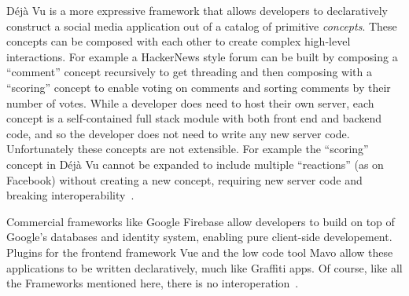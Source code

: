 Déjà Vu is a more expressive framework that allows developers
to declaratively construct a social media application out
of a catalog of primitive \emph{concepts}.
These concepts can be composed with each other to create complex
high-level interactions.
For example a HackerNews style forum can be built by
composing a ``comment'' concept
recursively to get threading and then composing
with a ``scoring'' concept to enable voting on comments and
sorting comments by their number of votes.
While a developer does need to host their own server,
each concept is a self-contained full stack module with both
front end and backend code, and so the developer does not need to write any new server code.
Unfortunately these concepts are not extensible.
For example the ``scoring'' concept in Déjà Vu cannot be expanded
to include multiple ``reactions'' (as on Facebook)
without creating a new concept, requiring new server code
and breaking interoperability~\cite{dejavu}.

Commercial frameworks like Google Firebase allow developers
to build on top of Google's databases and identity system,
enabling pure client-side developement.
Plugins for the frontend framework Vue and the low code tool
Mavo allow these applications to be written declaratively,
much like Graffiti apps.
Of course, like all the Frameworks mentioned here,
there is no interoperation~\cite{mavo,mavochat}.




